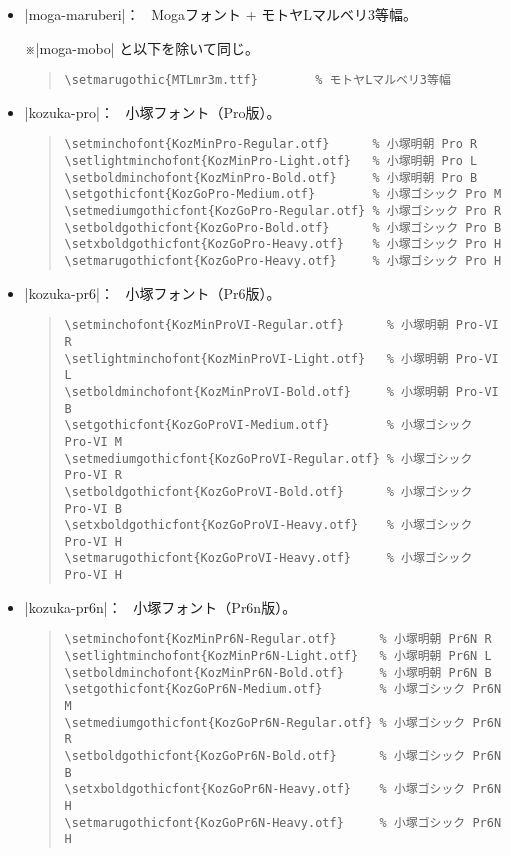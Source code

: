 \documentclass[a4paper,uplatex]{jsarticle}
\newcommand{\Note}{\par\noindent ※}
\newcommand{\Means}{：\ }
\begin{document}
\begin{itemize}
\item |moga-maruberi|\Means
   Mogaフォント + モトヤLマルベリ3等幅。
   \Note |moga-mobo| と以下を除いて同じ。
\begin{quote}\small\begin{verbatim}
\setmarugothic{MTLmr3m.ttf}        % モトヤLマルベリ3等幅
\end{verbatim}\end{quote}

\item |kozuka-pro|\Means
  小塚フォント（Pro版）。
\begin{quote}\small\begin{verbatim}
\setminchofont{KozMinPro-Regular.otf}      % 小塚明朝 Pro R
\setlightminchofont{KozMinPro-Light.otf}   % 小塚明朝 Pro L
\setboldminchofont{KozMinPro-Bold.otf}     % 小塚明朝 Pro B
\setgothicfont{KozGoPro-Medium.otf}        % 小塚ゴシック Pro M
\setmediumgothicfont{KozGoPro-Regular.otf} % 小塚ゴシック Pro R
\setboldgothicfont{KozGoPro-Bold.otf}      % 小塚ゴシック Pro B
\setxboldgothicfont{KozGoPro-Heavy.otf}    % 小塚ゴシック Pro H
\setmarugothicfont{KozGoPro-Heavy.otf}     % 小塚ゴシック Pro H
\end{verbatim}\end{quote}

\item |kozuka-pr6|\Means
  小塚フォント（Pr6版）。
\begin{quote}\small\begin{verbatim}
\setminchofont{KozMinProVI-Regular.otf}      % 小塚明朝 Pro-VI R
\setlightminchofont{KozMinProVI-Light.otf}   % 小塚明朝 Pro-VI L
\setboldminchofont{KozMinProVI-Bold.otf}     % 小塚明朝 Pro-VI B
\setgothicfont{KozGoProVI-Medium.otf}        % 小塚ゴシック Pro-VI M
\setmediumgothicfont{KozGoProVI-Regular.otf} % 小塚ゴシック Pro-VI R
\setboldgothicfont{KozGoProVI-Bold.otf}      % 小塚ゴシック Pro-VI B
\setxboldgothicfont{KozGoProVI-Heavy.otf}    % 小塚ゴシック Pro-VI H
\setmarugothicfont{KozGoProVI-Heavy.otf}     % 小塚ゴシック Pro-VI H
\end{verbatim}\end{quote}

\item |kozuka-pr6n|\Means
  小塚フォント（Pr6n版）。
\begin{quote}\small\begin{verbatim}
\setminchofont{KozMinPr6N-Regular.otf}      % 小塚明朝 Pr6N R
\setlightminchofont{KozMinPr6N-Light.otf}   % 小塚明朝 Pr6N L
\setboldminchofont{KozMinPr6N-Bold.otf}     % 小塚明朝 Pr6N B
\setgothicfont{KozGoPr6N-Medium.otf}        % 小塚ゴシック Pr6N M
\setmediumgothicfont{KozGoPr6N-Regular.otf} % 小塚ゴシック Pr6N R
\setboldgothicfont{KozGoPr6N-Bold.otf}      % 小塚ゴシック Pr6N B
\setxboldgothicfont{KozGoPr6N-Heavy.otf}    % 小塚ゴシック Pr6N H
\setmarugothicfont{KozGoPr6N-Heavy.otf}     % 小塚ゴシック Pr6N H
\end{verbatim}\end{quote}


\end{itemize}
\end{document}
